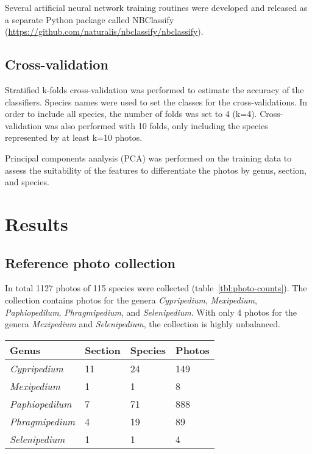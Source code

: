 \documentclass[review,3p,twocolumn]{elsarticle}
\begin{document}
Several artificial neural network training routines were developed and released as a separate Python package called NBClassify (\url{https://github.com/naturalis/nbclassify/nbclassify}).

\subsection{Cross-validation}

Stratified k-folds cross-validation was performed to estimate the accuracy of the classifiers. Species names were used to set the classes for the cross-validations. In order to include all species, the number of folds was set to 4 (k=4). Cross-validation was also performed with 10 folds, only including the species represented by at least k=10 photos.

Principal components analysis (PCA) was performed on the training data to assess the suitability of the features to differentiate the photos by genus, section, and species.

\section{Results}
\label{sect:results}

\subsection{Reference photo collection}

In total 1127 photos of 115 species were collected (table~\ref{tbl:photo-counts}). The collection contains photos for the genera \textit{Cypripedium}, \textit{Mexipedium}, \textit{Paphiopedilum}, \textit{Phragmipedium}, and \textit{Selenipedium}. With only 4 photos for the genera \textit{Mexipedium} and \textit{Selenipedium}, the collection is highly unbalanced.

\begin{table*}[t]\footnotesize
    \caption{The number of photos collected per genus, as well as the number of sections and species per genus represented by the photo collection. A total of 1127 photos of 115 species were collected.}
    \begin{center}
    \begin{tabular}{llll}
    \toprule
    \textbf{Genus} & \textbf{Section} & \textbf{Species} & \textbf{Photos} \\
    \midrule
    \textit{Cypripedium} & 11 & 24 & 149 \\
    \textit{Mexipedium} & 1 & 1 & 8 \\
    \textit{Paphiopedilum} & 7 & 71 & 888 \\
    \textit{Phragmipedium} & 4 & 19 & 89 \\
    \textit{Selenipedium} & 1 & 1 & 4 \\
    \bottomrule
    \end{tabular}
    \end{center}
    \label{tbl:photo-counts}
\end{table*}
\end{document}
